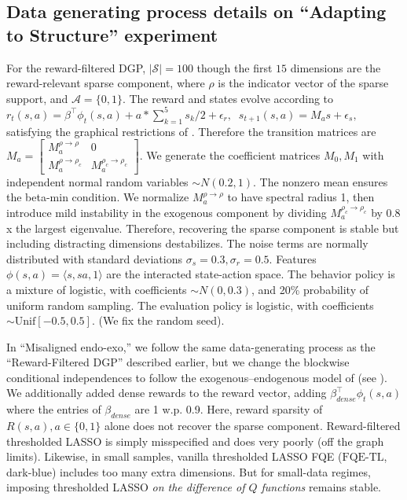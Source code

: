 \documentclass[opre,nonblindrev]{informs4}
\begin{document}
\subsection{Data generating process details on ``Adapting to Structure'' experiment}

For the reward-filtered DGP, $\vert \mathcal{S} \vert = 100$ though the first $15$ %
dimensions are the reward-relevant sparse component, where $\rho$ is the indicator vector of the sparse support, and $\mathcal{A} = \{ 0, 1\}$. The reward and states evolve according to $r_t(s,a) = \beta^\top \phi_t(s,a) + a*\sum_{k=1}^5 s_k /2 + \epsilon_r, \;\; s_{t+1}(s,a) = M_a s + \epsilon_s,$ satisfying the graphical restrictions of . Therefore the transition matrices are $M_a = \begin{bmatrix} M_{a}^{\rho \to \rho } & 0 \\
M_{a}^{\rho \to {\rho_c} } & M_{a}^{{\rho_c} \to {\rho_c} } 
\end{bmatrix}.$ {We generate the coefficient matrices $M_0,M_1$ with independent normal random variables $\sim N(0.2, 1)$.} The nonzero mean ensures the beta-min condition. We normalize $M_{a}^{\rho \to \rho }$ to have spectral radius 1, then introduce mild instability in the exogenous component by dividing $M_{a}^{{\rho_c} \to {\rho_c} }$ by $0.8$x the largest eigenvalue. Therefore, recovering the sparse component is stable but including distracting dimensions destabilizes. The noise terms are normally distributed with standard deviations $\sigma_s = 0.3, \sigma_r = 0.5.$ Features $\phi(s,a) = \langle s, s  a, 1 \rangle$ are the interacted state-action space. 
The behavior policy is a mixture of logistic, with coefficients $\sim N(0,0.3)$, and 20\% probability of uniform random sampling. The evaluation policy is logistic, with coefficients $\sim \text{Unif}[-0.5,0.5].$ (We fix the random seed).

In ``Misaligned endo-exo,'' { we follow the same data-generating process as the ``Reward-Filtered DGP'' described earlier, but} we change the blockwise conditional independences to follow the exogenous--endogenous model of \citet{dietterich2018discovering} (see ). {We additionally added dense rewards to the reward vector, adding $\beta^{\top}_{dense} \phi_t(s, a)$ where the entries of $\beta_{dense}$ are 1 w.p. 0.9.} Here, reward sparsity of $R(s,a), a \in \{0,1\}$ alone does not recover the sparse component. Reward-filtered thresholded LASSO is simply misspecified and does very poorly (off the graph limits). Likewise, in small samples, vanilla thresholded LASSO FQE ($\textrm{FQE-TL}$, dark-blue) includes too many extra dimensions. But for small-data regimes, imposing thresholded LASSO \textit{on the difference of $Q$ functions} remains stable. %
\end{document}
